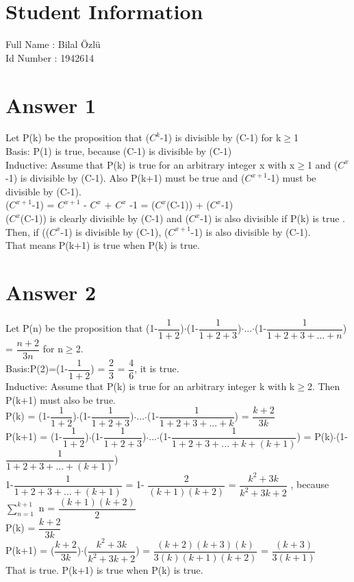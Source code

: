 \documentclass[12pt]{article}
\begin{document}
\section*{Student Information } 
Full Name : Bilal Özlü \\
Id Number : 1942614 \\

\section*{Answer 1}
 Let P(k) be the proposition that ($C^{k}$-1) is divisible by (C-1) for k$\geq$1 \\
 Basis: P(1) is true, because (C-1) is divisible by (C-1) \\
 Inductive: Assume that P(k) is true for an arbitrary integer x with x$\geq$1 and ($C^{x}$-1) is divisible by (C-1). Also P(k+1) must be true and ($C^{x+1}$-1) must be divisible by (C-1). \\
 ($C^{x+1}$-1) = $C^{x+1}$ - $C^{x}$  + $C^{x}$ -1 = ($C^{x}$(C-1)) + ($C^{x}$-1) \\
 ($C^{x}$(C-1)) is clearly divisible by (C-1) and ($C^{x}$-1) is also divisible if P(k) is true . Then, if (($C^{x}$-1) is divisible by (C-1), ($C^{x+1}$-1) is also divisible by (C-1). \\
 That means P(k+1) is true when P(k) is true. \\
\section*{Answer 2}
 Let P(n) be the proposition that (1-$\dfrac{1}{1+2}$)$\cdot$(1-$\dfrac{1}{1+2+3}$)$\cdot$...$\cdot$(1-$\dfrac{1}{1+2+3+...+n}$) = $\dfrac{n+2}{3n}$ for n$\geq$2. \\
 Basis:P(2)=(1-$\dfrac{1}{1+2}$) = $\dfrac{2}{3}$ = $\dfrac{4}{6}$, it is true. \\
 Inductive: Assume that P(k) is true for an arbitrary integer k with k$\geq$2. Then P(k+1) must also be true. \\
 P(k) = (1-$\dfrac{1}{1+2}$)$\cdot$(1-$\dfrac{1}{1+2+3}$)$\cdot$...$\cdot$(1-$\dfrac{1}{1+2+3+...+k}$) = $\dfrac{k+2}{3k}$ \\
 P(k+1) = (1-$\dfrac{1}{1+2}$)$\cdot$(1-$\dfrac{1}{1+2+3}$)$\cdot$...$\cdot$(1-$\dfrac{1}{1+2+3+...+k+(k+1)}$) = P(k)$\cdot$(1-$\dfrac{1}{1+2+3+...+(k+1)}$) \\
 1-$\dfrac{1}{1+2+3+...+(k+1)}$ = 1- $\dfrac{2}{(k+1)(k+2)}$ = $\dfrac{k^{2}+3k}{k^{2}+3k+2}$ , because $\sum_{n=1}^{k+1}$ n = $\dfrac{(k+1)(k+2)}{2}$ \\
 P(k) = $\dfrac{k+2}{3k}$ \\
 P(k+1) = ($\dfrac{k+2}{3k}$)$\cdot$($\dfrac{k^{2}+3k}{k^{2}+3k+2}$) = $\dfrac{(k+2)(k+3)(k)}{3(k)(k+1)(k+2)}$ = $\dfrac{(k+3)}{3(k+1)}$ \\
 That is true. P(k+1) is true when P(k) is true. \\
\end{document}
